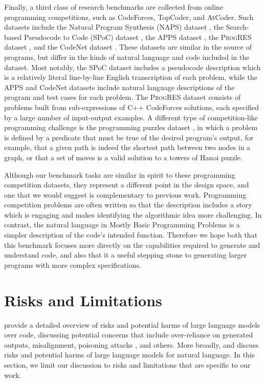 Finally, a third class of research benchmarks are collected from online programming competitions, such as CodeForces, TopCoder, and AtCoder. Such datasets include the Natural Program Synthesis (NAPS) dataset \citep{naps}, the Search-based Pseudocode to Code (SPoC) dataset \citep{spoc}, the APPS dataset \citep{apps}, the \textsc{ProgRES} dataset \citep{alet2020measuring}, and the CodeNet dataset \citep{codenet}. These datasets are similar in the source of programs, but differ in the kinds of natural language and code included in the dataset. Most notably, the SPoC dataset includes a  pseudocode description which is a relatively literal line-by-line English transcription of each problem, while the APPS and CodeNet datasets include natural language descriptions of the program and test cases for each problem. The \textsc{ProgRES} dataset consists of problems built from sub-expressions of C++ CodeForces solutions, each specified by a large number of input-output examples. A different type of competition-like programming challenge is the programming puzzles dataset \citep{puzzles}, in which a problem is defined by a predicate that must be true of the desired program's output, for example, that a given path is indeed the shortest path between two nodes in a graph, or that a set of moves is a valid solution to a towers of Hanoi puzzle.

Although our benchmark tasks are similar in spirit to these programming competition datasets, they represent a different point in the design space, and one that we would suggest is complementary to previous work. Programming competition problems are often written so that the description includes a story which is engaging and makes identifying the algorithmic idea more challenging.  In contrast, the natural language in Mostly Basic Programming Problems is a simpler description of the code's intended function. Therefore we hope both that this benchmark focuses more directly on the capabilities required to generate and understand code, and also that it a useful stepping stone to generating larger programs with more complex specifications.

\section{Risks and Limitations}

\cite{codex} provide a detailed overview of risks and potential harms of large language models over code, discussing potential concerns that include over-reliance on generated outputs, misalignment, poisoning attacks \citep{Schuster2020-an}, and others. More broadly, \cite{bender-koller-2020-climbing} and \cite{Bender2021-pd} discuss risks and potential harms of large language models for natural language. In this section, we limit our discussion to risks and limitations that are specific to our work.

